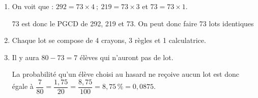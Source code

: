 
\medskip 

%

\begin{enumerate}
\item %
On voit que : $292 = 73 \times 4\:;\: 219 = 73 \times 3$
 et $73 = 73 \times 1$.
 
73 est donc le PGCD de 292, 219 et 73. On peut donc faire 73 lots identiques 
\item %
Chaque lot se compose de  4 crayons, 3 règles et 1 calculatrice. 
\item %
Il y aura $80 - 73 = 7$ élèves qui n'auront pas de lot.

La probabilité qu'un élève choisi au hasard ne reçoive aucun lot est donc égale à $\dfrac{7}{80} = \dfrac{1,75}{20} = \dfrac{8,75}{100} = 8,75\,\% = 0,0875$.
\end{enumerate}

\vspace{0,5cm}

